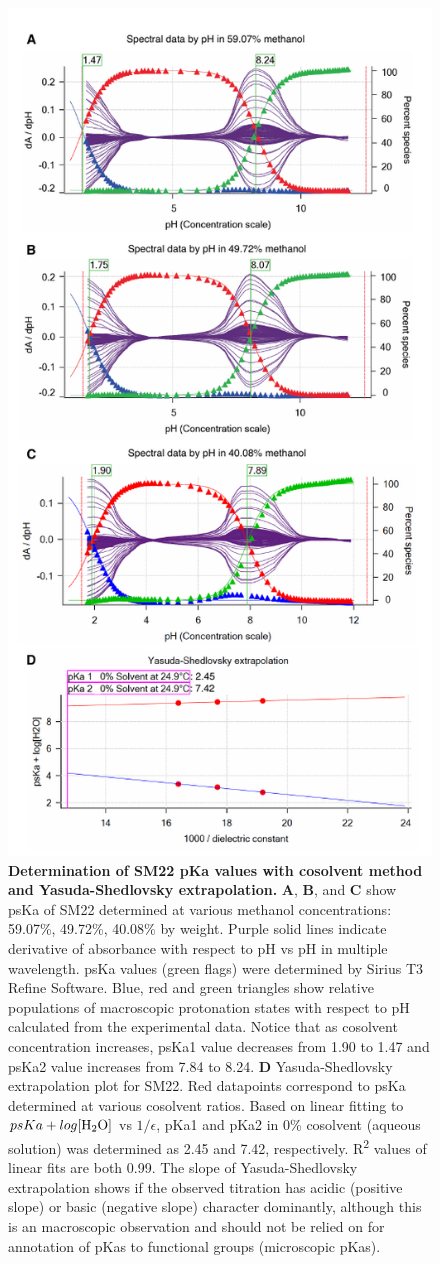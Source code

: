\documentclass[9pt,lineno]{elife}
\begin{document}
\begin{figure}
\begin{center}
\includegraphics[width=0.5\linewidth]{figures/SM22_cosolvent_extrapolation_fig}
\caption{{\bf Determination of SM22 pKa values with cosolvent method and Yasuda-Shedlovsky extrapolation.} 
\textbf{A}, \textbf{B}, and \textbf{C} show psKa of SM22 determined at various methanol concentrations: 59.07\%, 49.72\%, 40.08\% by weight.  Purple solid lines indicate derivative of absorbance with respect to pH vs pH in multiple wavelength. psKa values (green flags) were determined by Sirius T3 Refine Software. Blue, red and green triangles show relative populations of macroscopic protonation states with respect to pH calculated from the experimental data. Notice that as cosolvent concentration increases, psKa1 value decreases from 1.90 to 1.47 and psKa2 value increases from 7.84 to 8.24. \textbf{D} Yasuda-Shedlovsky extrapolation plot for SM22. Red datapoints correspond to psKa determined at various cosolvent ratios. Based on linear fitting to $psKa + log [\ce{H2O}]$ vs $1/\epsilon$, pKa1 and pKa2 in 0\% cosolvent (aqueous solution) was determined as 2.45 and 7.42, respectively. R\textsuperscript{2} values of linear fits are both 0.99. The slope of Yasuda-Shedlovsky extrapolation shows if the observed titration has acidic (positive slope) or basic (negative slope) character dominantly, although this is an macroscopic observation and should not be relied on for annotation of pKas to functional groups (microscopic pKas).
} 
\label{fig:YS_extrapolation}
\end{center}
\end{figure}
\end{document}
